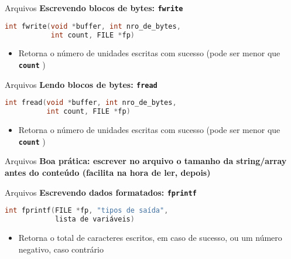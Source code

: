 \documentclass[10pt]{beamer}
\begin{document}
\begin{frame}[fragile]{Arquivos}
  \huge
  \textbf{Escrevendo blocos de bytes: \texttt{fwrite}}
  \vfill
  \large
  \begin{lstlisting}[language=C]
int fwrite(void *buffer, int nro_de_bytes,
           int count, FILE *fp)
  \end{lstlisting}
  \vfill
  \setlength{\leftmargini}{0pt}
  \begin{itemize}
      \item [] Retorna o número de unidades escritas com sucesso (pode ser menor que \textbf{\texttt{count}} \faExclamationTriangle)
  \end{itemize}
\end{frame}

\begin{frame}[fragile]{Arquivos}
  \huge
  \textbf{Lendo blocos de bytes: \texttt{fread}}
  \vfill
  \large
  \begin{lstlisting}[language=C]
int fread(void *buffer, int nro_de_bytes,
          int count, FILE *fp)
  \end{lstlisting}
  \vfill
  \setlength{\leftmargini}{0pt}
  \begin{itemize}
      \item [] Retorna o número de unidades escritas com sucesso (pode ser menor que \textbf{\texttt{count}} \faExclamationTriangle)
  \end{itemize}
\end{frame}

\begin{frame}{Arquivos}
  \huge
  \textbf{Boa prática: escrever no arquivo o tamanho da string/array antes do conteúdo (facilita na hora de ler, depois)}
\end{frame}

\begin{frame}[fragile]{Arquivos}
  \huge
  \textbf{Escrevendo dados formatados: \texttt{fprintf}}
  \vfill
  \large
  \begin{lstlisting}[language=C]
int fprintf(FILE *fp, "tipos de saída",
            lista de variáveis)
  \end{lstlisting}
  \vfill
  \setlength{\leftmargini}{0pt}
  \begin{itemize}
      \item [] Retorna o total de caracteres escritos, em caso de sucesso, ou um número negativo, caso contrário
  \end{itemize}
\end{frame}
\end{document}
